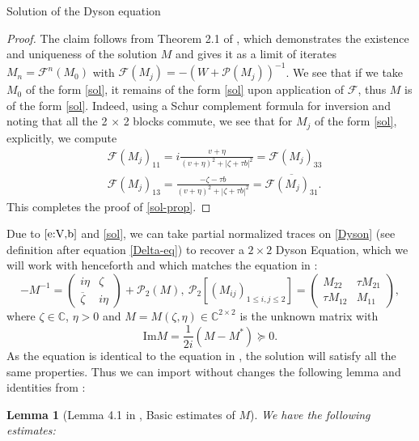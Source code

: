 \documentclass[11pt, a4paper, oneside]{book}
\numberwithin{equation}{chapter}
\newcommand{\beq}{\begin{equation}}
\newcommand{\eeq}{\end{equation}}
\newtheorem{lem}[thm]{Lemma}
\begin{document}
\begin{section}{Solution of the Dyson equation}
\begin{proof}
The claim follows from Theorem 2.1 of \cite{helton2007operator}, which demonstrates the existence and uniqueness of the solution $M$ and gives it as a limit of iterates $M_n = \mathcal{F}^n(M_0)$ with $\mathcal{F}(M_j) = - (W + \mathscr{P}(M_j))^{-1}$. We see that if we take $M_0$ of the form \eqref{sol}, it remains of the form \eqref{sol} upon application of $\mathcal{F}$, thus $M$ is of the form \eqref{sol}. Indeed, using a Schur complement formula for inversion and noting that all the 2 $\times$ 2 blocks commute, we see that for $M_j$ of the form \eqref{sol}, explicitly, we compute
%
\begin{align}
&\mathcal{F}(M_j)_{11} = i \frac{v+\eta}{(v+\eta)^2 + |\zeta +\tau b|^2} = \mathcal{F}(M_j)_{33} \\
&\mathcal{F}(M_j)_{13} = \frac{-\zeta - \tau b}{(v+\eta)^2 + |\zeta +\tau b|^2} = \overline{\mathcal{F}(M_j)_{31}}.
\end{align}
This completes the proof of \ref{sol-prop}.
\end{proof}
%
Due to $\eqref{e:V,b}$ and \eqref{sol}, we can take partial normalized traces on \eqref{Dyson}  (see definition after equation \eqref{Delta-eq}) to recover a $2 \times 2$ Dyson Equation, which we will work with henceforth and which matches the equation in \cite{alt2022local}:
%
\beq \label{Dyson2}
-M^{-1} = \begin{pmatrix} i\eta & \zeta \\ \overline{\zeta} & i\eta \end{pmatrix} + \mathscr{P}_2(M), \ \mathscr{P}_2\left [ (M_{ij})_{1 \leq i, j \leq 2} \right] = \begin{pmatrix} M_{22}  & \tau   M_{21} \\ \tau   M_{12}  &   M_{11}   \end{pmatrix},
\eeq
%
where $\zeta \in \mathbb{C}$, $\eta>0$ and $M=M(\zeta,\eta)\in \mathbb{C}^{2 \times 2}$ is the unknown matrix with
\begin{equation}\label{e:eqImM}
\mathrm{Im} M = \frac{1}{2i} (M - M^*) \succeq 0.
\end{equation}
%
As the equation is identical to the equation in \cite{alt2022local}, the solution will satisfy all the same properties. Thus we can import without changes the following lemma and identities from \cite{alt2022local}:
%
\pagebreak
%
\begin{lem} [Lemma 4.1 in \cite{alt2022local}, Basic estimates of $M$] \label{EST} We have the following estimates:
%
\begin{enumerate}[label=(\roman*)]

\end{enumerate}
\end{lem}
\end{section}
\end{document}
